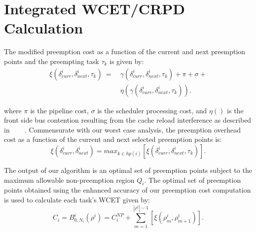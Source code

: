 \section{Integrated WCET/CRPD Calculation}\label{sec:schedulability_analysis}

The modified preemption cost as a function of the current and next preemption points and the preempting task \begin{math}\tau_{k}\end{math} is given by:
\begin{equation}\label{eqn:prempt-cost}
\begin{split}
    \xi(\delta_{curr}^{i},\delta_{next}^{i},\tau_{k})\ =\ &\gamma(\delta_{curr}^{i},\delta_{next}^{i},\tau_{k}) + \pi + \sigma + \\ &\eta(\gamma(\delta_{curr}^{i},\delta_{next}^{i},\tau_{k})).
\end{split}
\end{equation}

 \noindent
 where \begin{math}\pi\end{math} is the pipeline cost, \begin{math}\sigma\end{math} is the scheduler processing cost, and \begin{math}\eta()\end{math} is the front side bus contention resulting from the cache reload interference as described in~\cite{pellizzoni:07} ~\cite{pellizzoni:08} ~\cite{pellizzoni:11}.  Commensurate with our worst case analysis, the preemption overhead cost as a function of the current and next selected preemption points is:
\begin{equation}\label{eqn:prempt-cost}
    \xi(\delta_{curr}^{i},\delta_{next}^{i}) = \textit{max}_{k \in hp(i)} [ \xi(\delta_{curr}^{i},\delta_{next}^{i},\tau_{k})].
\end{equation}

The output of our algorithm is an optimal set of preemption points subject to the maximum allowable non-preemption region \begin{math}Q_{i}\end{math}.  The optimal set of preemption points obtained using the enhanced accuracy of our preemption cost computation is used to calculate each task's WCET given by:
\begin{equation}\label{eqn:wcet-cost}
   C_{i} = B_{0,N_{i}}^{i}(\rho^{i}) = C_{i}^{NP} + \sum_{m=1}^{|\rho^{i}|-1} [\xi(\rho_{m}^{i},\rho_{m+1}^{i})].
\end{equation}

